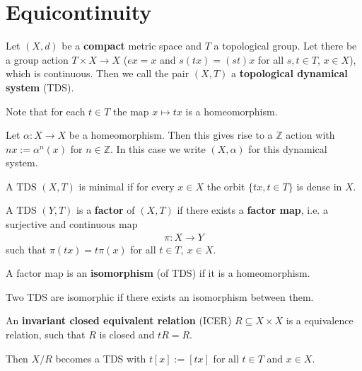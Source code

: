 \section{Equicontinuity}

\begin{frame}
	\begin{definition}
		Let $(X, d)$ be a \textbf{compact} metric space and $T$ a topological group. Let there be a group action $T \times X \to X$ ($ex = x$ and $s(tx) = (st)x$ for all $s, t \in T$, $x \in X$), which is continuous. Then we call the pair $(X, T)$ a \textbf{topological dynamical system} (TDS).
	\end{definition}
	\begin{remark}
		Note that for each $t \in T$ the map $x \mapsto tx$ is a homeomorphism.
	\end{remark}
	\begin{remark}
		Let $\alpha: X \to X$ be a homeomorphism. Then this gives rise to a $\mathbb{Z}$ action with $nx := \alpha^n(x)$ for $n \in \mathbb{Z}$. In this case we write $(X, \alpha)$ for this dynamical system.
	\end{remark}
	\begin{definition}
		A TDS $(X, T)$ is minimal if for every $x \in X$ the orbit $\{tx, t \in T\}$ is dense in $X$.
	\end{definition}
\end{frame}

\begin{frame}
	\begin{definition}
		A TDS $(Y, T)$ is a \textbf{factor} of $(X, T)$ if there exists a \textbf{factor map}, i.e. a surjective and continuous map
		\begin{align*}
			\pi: X \to Y
		\end{align*}
		such that $\pi(tx) = t\pi(x)$ for all $t \in T,\ x \in X$.
		
		A factor map is an \textbf{isomorphism} (of TDS) if it is a homeomorphism.
		
		Two TDS are isomorphic if there exists an isomorphism between them.
	\end{definition}
	\begin{definition}[ICER]
		An \textbf{invariant closed equivalent relation} (ICER) $R \subseteq X \times X$ is a equivalence relation, such that $R$ is closed and $tR = R$.
		
		Then $X/R$ becomes a TDS with $t[x] := [tx]$ for all $t \in T$ and $x \in X$.
	\end{definition}
\end{frame}

